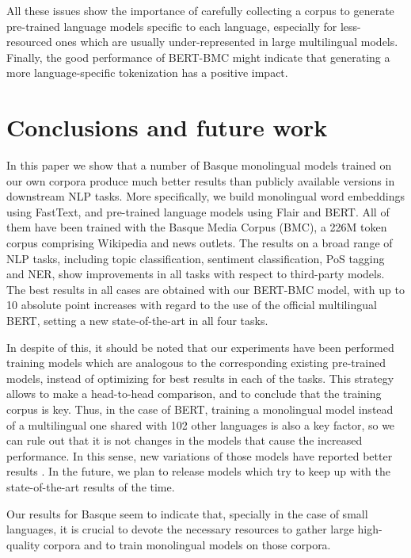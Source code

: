 \documentclass[10pt, a4paper]{article}
\begin{document}
All these issues show the importance of carefully collecting a corpus to generate pre-trained language models specific to each language, especially for less-resourced ones which are usually under-represented in large multilingual models. Finally, the good performance of BERT-BMC might indicate that generating a more language-specific tokenization has a positive impact.

\section{Conclusions and future work}\label{sec:concl-future-work}

In this paper we show that a number of Basque monolingual models trained on our own corpora produce much better results than publicly available versions in downstream NLP tasks. More specifically, we build monolingual word embeddings using FastText, and pre-trained language models using Flair and BERT. All of them have been trained with the Basque Media Corpus (BMC), a 226M token corpus comprising Wikipedia and news outlets. The results on a broad range of NLP tasks, including topic classification, sentiment classification, PoS tagging and NER, show improvements in all tasks with respect to third-party models. The best results in all cases are obtained with our BERT-BMC model, with up to 10 absolute point increases with regard to the use of the official multilingual BERT, setting a new state-of-the-art in all four tasks.

In despite of this, it should be noted that our experiments have been performed training models which are analogous to the corresponding existing pre-trained models, instead of optimizing for best results in each of the tasks. This strategy allows to make a head-to-head comparison, and to conclude that the training corpus is key. Thus, in the case of BERT, training a monolingual model instead of a multilingual one shared with 102 other languages is also a key factor, so we can rule out that it is not changes in the models that cause the increased performance. In this sense, new variations of those models have reported better results \cite{liu2019roberta}. In the future, we plan to release models which try to keep up with the state-of-the-art results of the time.

Our results for Basque seem to indicate that, specially in the case of small languages, it is crucial to devote the necessary resources to gather large high-quality corpora and to train monolingual models on those corpora.
\end{document}
